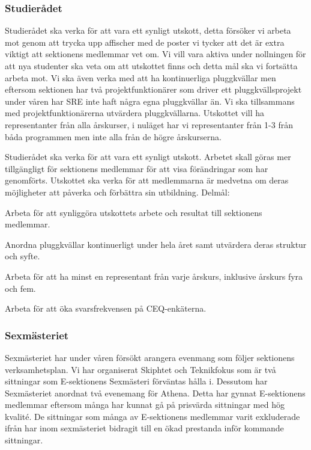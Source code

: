 \documentclass[../_main/handlingar.tex]{subfiles}
\begin{document}
\subsubsection*{Studierådet}
Studierådet ska verka för att vara ett synligt utskott, detta försöker vi arbeta mot genom att trycka upp affischer med de poster vi tycker att det är extra viktigt att sektionens medlemmar vet om. Vi vill vara aktiva under nollningen för att nya studenter ska veta om att utskottet finns och detta mål ska vi fortsätta arbeta mot. Vi ska även verka med att ha kontinuerliga pluggkvällar men eftersom sektionen har två projektfunktionärer som driver ett pluggkvällsprojekt under våren har SRE inte haft några egna pluggkvällar än. Vi ska tillsammans med projektfunktionärerna utvärdera pluggkvällarna. Utskottet vill ha representanter från alla årskurser, i nuläget har vi representanter från 1-3 från båda programmen men inte alla från de högre årskurserna.  

Studierådet ska verka för att vara ett synligt utskott. Arbetet skall göras mer tillgängligt för sektionens medlemmar för att visa förändringar som har genomförts. Utskottet ska verka för att medlemmarna är medvetna om deras möjligheter att påverka och förbättra sin utbildning.
Delmål:
\begin{dashlist}
    \item Arbeta för att synliggöra utskottets arbete och resultat till sektionens medlemmar. 
    \item Anordna pluggkvällar kontinuerligt under hela året samt utvärdera deras struktur och syfte.
    \item Arbeta för att ha minst en representant från varje årskurs, inklusive årskurs fyra och fem.
    \item Arbeta för att öka svarsfrekvensen på CEQ-enkäterna.
\end{dashlist}

\subsubsection*{Sexmästeriet}
Sexmästeriet har under våren  försökt arangera evenmang som följer sektionens verksamhetsplan. Vi har organiserat Skiphtet och Teknikfokus som är två sittningar som E-sektionens Sexmästeri förväntas hålla i. Dessutom har Sexmästeriet anordnat två evenemang för Athena. Detta har gynnat E-sektionens medlemmar eftersom många har kunnat gå på prisvärda sittningar med hög kvalité. De sittningar som många av E-sektionens medlemmar varit exkluderade ifrån har inom sexmästeriet bidragit till en ökad prestanda inför kommande sittningar. 
\end{document}
